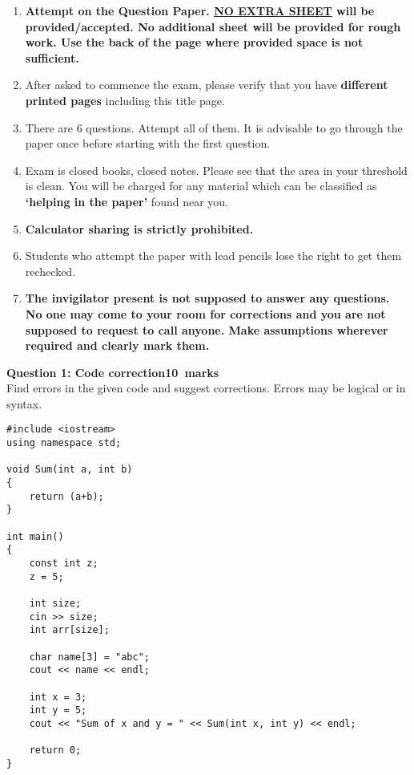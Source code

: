 \documentclass[12pt,a4paper]{article}
\def\QOne{10}
\begin{document}
\begin{enumerate}
\item \textbf{Attempt on the Question Paper. \underline{NO EXTRA SHEET} will be provided/accepted. No
additional sheet will be provided for rough work. Use the back of the page where
provided space is not sufficient.}
\item After asked to commence the exam, please verify that you have \textbf{\pageref{LastPage} different
printed pages} including this title page.
\item There are 6 questions. Attempt all of them. It is advisable to go through the paper once
before starting with the first question.
\item Exam is closed books, closed notes. Please see that the area in your threshold is clean.
You will be charged for any material which can be classified as \textbf{`helping in the paper'}
found near you.
\item \textbf{Calculator sharing is strictly prohibited.}
\item Students who attempt the paper with lead pencils lose the right to get them rechecked.
\item \textbf{The invigilator present is not supposed to answer any questions. No one may come
to your room for corrections and you are not supposed to request to call anyone.
Make assumptions wherever required and clearly mark them.}
\end{enumerate}
\newpage
\noindent\textbf{Question 1: Code correction\hfill \QOne~marks}\\
Find errors in the given code and suggest corrections. Errors may be logical or in syntax.
\begin{lstlisting}
#include <iostream>
using namespace std;

void Sum(int a, int b)
{
	return (a+b);
}

int main()
{
	const int z;
	z = 5;

	int size;
	cin >> size;
	int arr[size];

	char name[3] = "abc";
	cout << name << endl;

	int x = 3;
	int y = 5;
	cout << "Sum of x and y = " << Sum(int x, int y) << endl;

	return 0;
}
\end{lstlisting}
\begin{figure}[H]
\end{figure}
\end{document}

